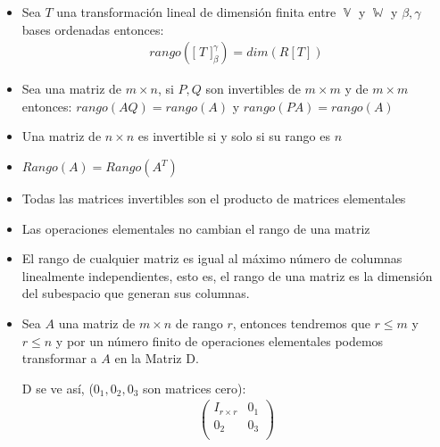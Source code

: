 \documentclass[12pt, fleqn]{report}                             %
\theoremstyle{break}                                            %
\DeclareMathOperator \VectorSet    {\mathbb{V}}                 %
\DeclareMathOperator \SubVectorSet {\mathbb{W}}                 %
\newcommand{\BigBrackets}[1] {\Big[ \; #1 \; \Big]}             %
\newcommand{\Wrap}[1]    {\left( #1 \right)}                    %
\newcommand{\pVector}[1]                                        %
        { \ensuremath{\begin{pmatrix}#1\end{pmatrix}} }             %
\begin{document}
                \begin{itemize}

                    \item
                        Sea $T$ una transformación lineal de dimensión finita entre $\VectorSet$
                        y $\SubVectorSet$ y $\beta, \gamma$ bases ordenadas entonces:
                        \begin{align*}
                            rango\Wrap{\BigBrackets{T}_\beta^\gamma} = dim(R[T])
                        \end{align*}
                    
                    \item 
                        Sea una matriz de $m \times n$, si $P, Q$ son invertibles de $m \times m$
                        y de $m \times m$ entonces:
                        $rango(AQ) = rango(A)$ y $rango(PA) = rango(A)$

                    \item
                        Una matriz de $n \times n$ es invertible si y solo si
                        su rango es $n$

                    \item
                        $Rango(A) = Rango(A^T)$

                    \item
                        Todas las matrices invertibles son el producto de matrices elementales

                    \item
                        Las operaciones elementales no cambian el rango de una matriz

                    \item
                        El rango de cualquier matriz es igual al máximo número de columnas
                        linealmente independientes, esto es, el rango de una matriz
                        es la dimensión del subespacio que generan sus columnas.

                    \item
                        Sea $A$ una matriz de $m \times n$ de rango $r$, entonces
                        tendremos que $r \leq m$ y $r \leq n$
                        y por un número finito de operaciones elementales podemos transformar
                        a $A$ en la Matriz D.

                        D se ve así, ($0_1, 0_2, 0_3$ son matrices cero):
                        \begin{align*}
                            \pVector{
                                I_{r \times r} & 0_1 \\
                                0_2            & 0_3 \\
                            }
                        \end{align*}
                        

\end{itemize}
\end{document}
